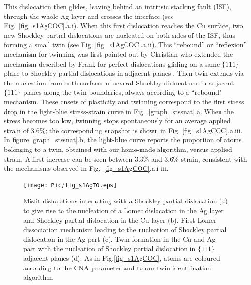 \documentclass[final,3p,times,twocolumn]{elsarticle}
\begin{document}
This dislocation then glides, leaving behind an intrinsic stacking fault (ISF), through the whole Ag layer and crosses the interface (see Fig.~\ref{fig_s1AgCOC}.a.i). When this first dislocation reaches the Cu surface, two new Shockley partial dislocations are nucleated on both sides of the ISF, thus forming a small twin (see Fig. \ref{fig_s1AgCOC}.a.ii). This ``rebound'' or ``reflexion'' mechanism for twinning was first pointed out by Christian who extended the mechanism described by Frank for perfect dislocations gliding on a same $\lbrace111\rbrace$ plane \cite{hirth82book} to Shockley partial dislocations in adjacent planes \cite{christian51PRS}. Then twin extends via the nucleation from both surfaces of several Shockley dislocations in adjacent $\lbrace111\rbrace$  planes along the twin boundaries, always according to a ``rebound" mechanism. These onsets of plasticity and twinning correspond to the first stress drop in the light-blue stress-strain curve in Fig.~\ref{graph_stssnat}.a. When the stress becomes too low, twinning stops spontaneously for an average applied strain of 3.6\%; the corresponding snapshot is shown in Fig. \ref{fig_s1AgCOC}.a.iii. In figure \ref{graph_stssnat}.b, the light-blue curve reports the proportion of atoms belonging to a twin, obtained with our home-made algorithm, versus applied strain. A first increase can be seen between 3.3\% and 3.6\% strain, consistent with the mechanisms observed in Fig.~\ref{fig_s1AgCOC}.a.i-iii. 

\begin{figure}[!t]
	\begin{center}
		\texttt{[image: Pic/fig\_s1AgTO.eps]} 
	\end{center}\caption{Misfit dislocations interacting with a Shockley partial dislocation (a) to give rise to the nucleation of a Lomer dislocation in the Ag layer and Shockley partial dislocation in the Cu layer (b). First Lomer dissociation mechanism leading to the nucleation of Shockley partial dislocation in the Ag part (c). Twin formation in the Cu and Ag part with the nucleation of Shockley partial dislocation in $\lbrace111\rbrace$ adjacent planes (d). As in Fig.\ref{fig_s1AgCOC}, atoms are coloured according to the CNA parameter and to our twin identification algorithm.}\label{fig_react_TO}
\end{figure}
\end{document}
